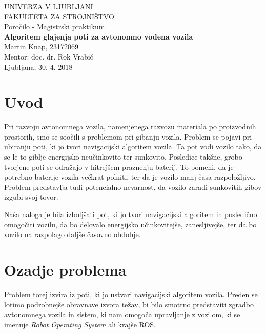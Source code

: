 \documentclass[10pt,a4paper]{article}
\begin{document}
\begin{titlepage}
	\begin{center}
		\large UNIVERZA V LJUBLJANI
		\\[1cm]
		\large FAKULTETA ZA STROJNIŠTVO
		\\[5cm]
		\large Poročilo - Magistrski praktikum
		\\[0.5cm]
		\Large\textbf{Algoritem glajenja poti za avtonomno vodena vozila}
		\\[4cm]
		Martin Knap, 23172069
		\\[0.5cm]
		Mentor: doc. dr. Rok Vrabič
		\\[5cm]
		Ljubljana, 30. 4. 2018
	\end{center}
\end{titlepage}

\tableofcontents
\listoffigures
\clearpage


\section{Uvod}

Pri razvoju avtonomnega vozila, namenjenega razvozu materiala po proizvodnih prostorih, smo se soočili s problemom pri gibanju vozila. Problem se pojavi pri ubiranju poti, ki jo tvori navigacijski algoritem vozila. Ta pot vodi vozilo tako, da se le-to giblje energijsko neučinkovito ter sunkovito. Posledice takšne, grobo tvorjene poti se odražajo v hitrejšem praznenju baterij. To pomeni, da je potrebno baterije vozila večkrat polniti, ter da je vozilo manj časa razpoložljivo. Problem predstavlja tudi potencialno nevarnost, da vozilo zaradi sunkovitih gibov izgubi svoj tovor.

Naša naloga je bila izboljšati pot, ki jo tvori navigacijski algoritem in posledično omogočiti vozilu, da bo delovalo energijsko učinkovitejše, zanesljivejše, ter da bo vozilo na razpolago daljše časovno obdobje.

\section{Ozadje problema}

Problem torej izvira iz poti, ki jo ustvari navigacijski algoritem vozila. Preden se lotimo podrobnejše obravnave izvora težav, bi bilo smotrno predstaviti zgradbo avtonomnega vozila in sistem, ki nam omogoča upravljanje z vozilom, ki se imenuje \textit{Robot Operating System} ali krajše ROS.
\end{document}
